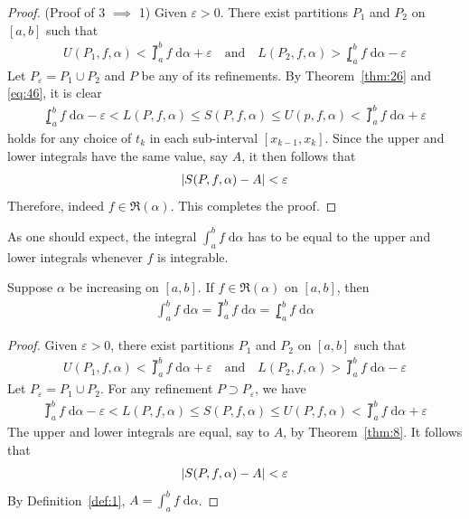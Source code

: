 \documentclass[thmcnt=section, 12pt]{my-elegantbook}
\begin{document}
\begin{proof}
    (Proof of 3 $\implies$ 1) Given $\varepsilon > 0$. There exist partitions $P_1$ and $P_2$ on $[a, b]$ such that 
    \begin{align*}
        U(P_1,f,\alpha) < \upint_a^b f \; \mathrm{d}\alpha + \varepsilon
        \quad \text{and} \quad 
        L(P_2,f,\alpha) > \lowint_a^b f \; \mathrm{d}\alpha - \varepsilon
    \end{align*}
    Let $P_\varepsilon = P_1 \cup P_2$ and $P$ be any of its refinements. By Theorem~\ref{thm:26} and \eqref{eq:46}, it is clear
    \begin{align*}
        \lowint_a^b f \; \mathrm{d}\alpha - \varepsilon
        < L(P,f,\alpha)
        \leq S(P,f,\alpha)
        \leq U(p,f,\alpha)
        < \upint_a^b f \; \mathrm{d}\alpha + \varepsilon
    \end{align*}
    holds for any choice of $t_k$ in each sub-interval $[x_{k-1}, x_k]$. Since the upper and lower integrals have the same value, say $A$, it then follows that 
    \begin{align*}
        \left\lvert S(P,f,\alpha) - A \right\rvert < \varepsilon
    \end{align*}
    Therefore, indeed $f \in \mathfrak{R}(\alpha)$. This completes the proof.
\end{proof}

As one should expect, the integral $\int_{a}^{b} f \; \mathrm{d}\alpha$ has to be equal to the upper and lower integrals whenever $f$ is integrable.

\begin{corollary}
    Suppose $\alpha$ be increasing on $[a, b]$. If $f \in \mathfrak{R}(\alpha)$ on $[a, b]$, then 
    \begin{align*}
        \int_{a}^{b} f \; \mathrm{d}\alpha
        = \upint_{a}^{b} f \; \mathrm{d}\alpha
        = \lowint_{a}^{b} f \; \mathrm{d}\alpha
    \end{align*}
\end{corollary}

\begin{proof}
    Given $\varepsilon > 0$, there exist partitions $P_1$ and $P_2$ on $[a, b]$ such that 
    \begin{align*}
        U(P_1,f,\alpha) < \upint_{a}^{b} f \; \mathrm{d}\alpha + \varepsilon
        \quad\text{and}\quad
        L(P_2,f,\alpha) > \upint_{a}^{b} f \; \mathrm{d}\alpha - \varepsilon
    \end{align*}
    Let $P_\varepsilon = P_1 \cup P_2$. For any refinement $P \supset P_\varepsilon$, we have 
    \begin{align*}
        \upint_{a}^{b} f \; \mathrm{d}\alpha - \varepsilon
        < L(P,f,\alpha)
        \leq S(P,f,\alpha)
        \leq U(P,f,\alpha)
        < \upint_{a}^{b} f \; \mathrm{d}\alpha + \varepsilon
    \end{align*}
    The upper and lower integrals are equal, say to $A$, by Theorem~\ref{thm:8}. It follows that 
    \begin{align*}
        \left\lvert S(P,f,\alpha) - A \right\rvert < \varepsilon
    \end{align*}
    By Definition~\ref{def:1}, $A = \int_{a}^{b} f \; \mathrm{d}\alpha$.
\end{proof}
\end{document}
